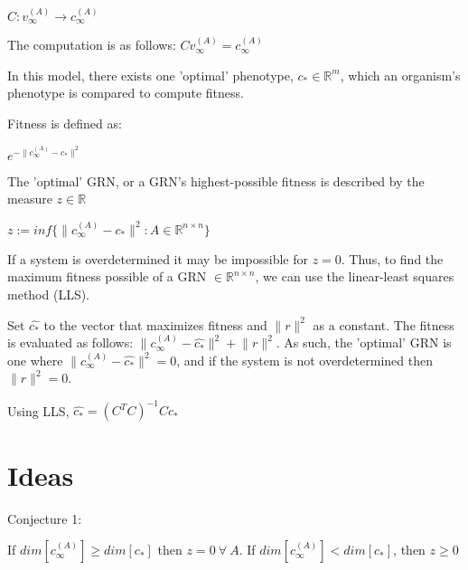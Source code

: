 \documentclass[a4paper,12pt]{article}
\begin{document}
$C: v_{\infty}^{(A)} \rightarrow c^{(A)}_{\infty}$

The computation is as follows: $Cv_{\infty}^{(A)} = c_{\infty}^{(A)}$

In this model, there exists one 'optimal' phenotype, $c_{*} \in \mathbb{R}^{m}$, which an organism's phenotype is compared to compute fitness. 

Fitness is defined as: 

$e^{-\lVert c_{\infty}^{(A)} - c_{*} \rVert^{2}}$

The 'optimal' GRN, or a GRN's highest-possible fitness is described by the measure $z \in \mathbb{R}$

$ z := inf\{\lVert c_{\infty}^{(A)} - c_{*} \rVert^{2}: A \in \mathbb{R}^{n \times n}\}$

If a system is overdetermined it may be impossible for $z = 0$. Thus, to find the maximum fitness possible of a GRN $\in \mathbb{R}^{n \times n}$, we can use the linear-least squares method (LLS). 

Set $\hat{c_{*}}$ to the vector that maximizes fitness and $\lVert r \rVert^{2}$ as a constant. The fitness is evaluated as follows: $\lVert c_{\infty}^{(A)} - \hat{c_{*}} \rVert^{2} + \lVert r \rVert^{2}$. As such, the 'optimal' GRN is one where $ \lVert c_{\infty}^{(A)} - \hat{c_{*}} \rVert^{2} = 0$, and if the system is not overdetermined then $ \lVert r \rVert^{2} = 0$. 

Using LLS, $\hat{c_{*}} = (C^{T}C)^{-1}Cc_{*}$

\section{Ideas}

Conjecture 1:

 If $dim{[c_{\infty}^{(A)}]} \geq dim{[c_{*}]}$ then $z = 0\ \forall \ A$. If $dim{[c_{\infty}^{(A)}]} <  dim{[c_{*}]}$, then $z \geq 0$
\end{document}

